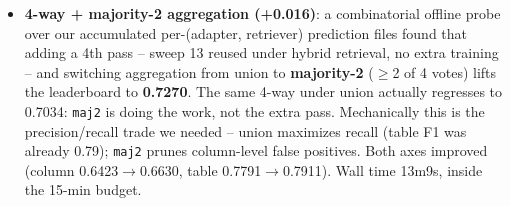 \documentclass[10pt]{article}
\begin{document}
\begin{itemize}
\texttt{main.py}'s \texttt{--ensemble\_dirs} via a \texttt{path[:retriever]}
spec per adapter.
\item \textbf{4-way + majority-2 aggregation (+0.016)}: a combinatorial
offline probe over our accumulated per-(adapter, retriever) prediction
files found that adding a 4th pass -- sweep 13 reused under hybrid
retrieval, no extra training -- and switching aggregation from union to
\textbf{majority-2} ($\geq$2 of 4 votes) lifts the leaderboard to
\textbf{0.7270}. The same 4-way under union actually regresses to 0.7034:
\texttt{maj2} is doing the work, not the extra pass. Mechanically this is
the precision/recall trade we needed -- union maximizes recall (table F1
was already 0.79); \texttt{maj2} prunes column-level false positives. Both
axes improved (column 0.6423$\rightarrow$0.6630, table 0.7791$\rightarrow$0.7911).
Wall time 13m9s, inside the 15-min budget.
\end{itemize}
\end{document}
